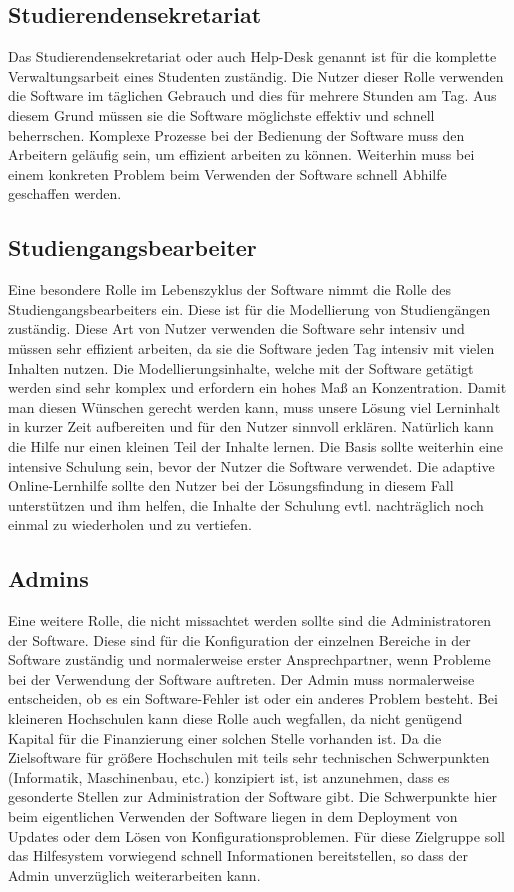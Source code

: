 \subsection{Studierendensekretariat}
Das Studierendensekretariat oder auch Help-Desk genannt ist für die komplette Verwaltungsarbeit eines Studenten zuständig. Die Nutzer dieser Rolle verwenden die Software im täglichen Gebrauch und dies für mehrere Stunden am Tag. Aus diesem Grund müssen sie die Software möglichste effektiv und schnell beherrschen. Komplexe Prozesse bei der Bedienung der Software muss den Arbeitern geläufig sein, um effizient arbeiten zu können. Weiterhin muss bei einem konkreten Problem beim Verwenden der Software schnell Abhilfe geschaffen werden. 

\subsection{Studiengangsbearbeiter}
Eine besondere Rolle im Lebenszyklus der Software nimmt die Rolle des Studiengangsbearbeiters ein. Diese ist für die Modellierung von Studiengängen zuständig. Diese Art von Nutzer verwenden die Software sehr intensiv und müssen sehr effizient arbeiten, da sie die Software jeden Tag intensiv mit vielen Inhalten nutzen. Die Modellierungsinhalte, welche mit der Software getätigt werden sind sehr komplex und erfordern ein hohes Maß an Konzentration. Damit man diesen Wünschen gerecht werden kann, muss unsere Lösung viel Lerninhalt in kurzer Zeit aufbereiten und für den Nutzer sinnvoll erklären. Natürlich kann die Hilfe nur einen kleinen Teil der Inhalte lernen. Die Basis sollte weiterhin eine intensive Schulung sein, bevor der Nutzer die Software verwendet. Die adaptive Online-Lernhilfe sollte den Nutzer bei der Lösungsfindung in diesem Fall unterstützen und ihm helfen, die Inhalte der Schulung evtl. nachträglich noch einmal zu wiederholen und zu vertiefen.

\subsection{Admins}
Eine weitere Rolle, die nicht missachtet werden sollte sind die Administratoren der Software. Diese sind für die Konfiguration der einzelnen Bereiche in der Software zuständig und normalerweise erster Ansprechpartner, wenn Probleme bei der Verwendung der Software auftreten. Der Admin muss normalerweise entscheiden, ob es ein Software-Fehler ist oder ein anderes Problem besteht. Bei kleineren Hochschulen kann diese Rolle auch wegfallen, da nicht genügend Kapital für die Finanzierung einer solchen Stelle vorhanden ist. Da die Zielsoftware für größere Hochschulen mit teils sehr technischen Schwerpunkten (Informatik, Maschinenbau, etc.) konzipiert ist, ist anzunehmen, dass es gesonderte Stellen zur Administration der Software gibt. Die Schwerpunkte hier beim eigentlichen Verwenden der Software liegen in dem Deployment von Updates oder dem Lösen von Konfigurationsproblemen. Für diese Zielgruppe soll das Hilfesystem vorwiegend schnell Informationen bereitstellen, so dass der Admin unverzüglich weiterarbeiten kann.


